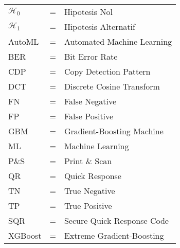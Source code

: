 \begin{tabular}{llp{3in}}
	$\mathcal{H}_{0}$ & \hspace{1.5cm} = & Hipotesis Nol              \\
	$\mathcal{H}_{1}$ & \hspace{1.5cm} = & Hipotesis Alternatif       \\
	AutoML            & \hspace{1.5cm} = & Automated Machine Learning \\
	BER               & \hspace{1.5cm} = & Bit Error Rate             \\
	CDP               & \hspace{1.5cm} = & Copy Detection Pattern     \\
	DCT               & \hspace{1.5cm} = & Discrete Cosine Transform  \\
	FN                & \hspace{1.5cm} = & False Negative             \\
	FP                & \hspace{1.5cm} = & False Positive             \\
	GBM               & \hspace{1.5cm} = & Gradient-Boosting Machine  \\
	ML                & \hspace{1.5cm} = & Machine Learning           \\
	P\&S              & \hspace{1.5cm} = & Print \& Scan              \\
	QR                & \hspace{1.5cm} = & Quick Response             \\
	TN                & \hspace{1.5cm} = & True Negative              \\
	TP                & \hspace{1.5cm} = & True Positive              \\
	SQR               & \hspace{1.5cm} = & Secure Quick Response Code \\
	XGBoost           & \hspace{1.5cm} = & Extreme Gradient-Boosting  \\
\end{tabular}